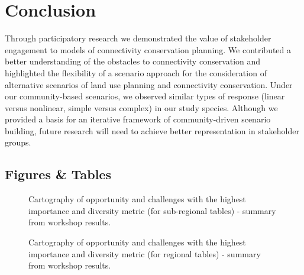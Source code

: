 {\section{Conclusion}

Through participatory research we demonstrated the value of stakeholder engagement to models of connectivity conservation planning. We contributed a better understanding of the obstacles to connectivity conservation and highlighted the flexibility of a scenario approach for the consideration of alternative scenarios of land use planning and connectivity conservation. Under our community-based scenarios, we observed similar types of response (linear versus nonlinear, simple versus complex) in our study species. Although we provided a basis for an iterative framework of community-driven scenario building, future research will need to achieve better representation in stakeholder groups. 


\newpage
\begin{center}
\section*{Figures \& Tables}
\end{center}




\begin{figure}[h!]
\caption{Cartography of opportunity and challenges  with the highest importance and diversity metric (for sub-regional tables) - summary from workshop results.}
\label{fig:reg_AC}
\end{figure}
\clearpage

\begin{figure}[h!]
\caption{Cartography of opportunity and challenges  with the highest importance and diversity metric (for regional tables) - summary from workshop results.}
\label{fig:trans_AC}
\end{figure}
\clearpage

}
